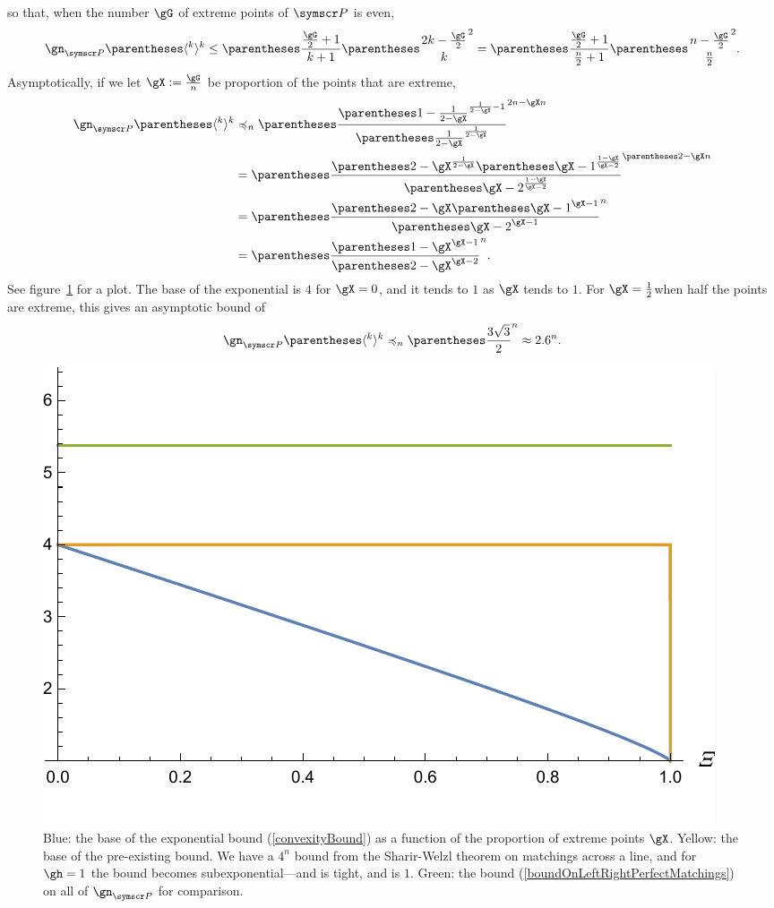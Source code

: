 so that, when the number $\gG$ of extreme points of $\pointset P$ is even,\[
\gn_{\pointset P}\of{\langle^k\rangle^k}\leq
\pa{\frac{\frac \gG 2+1}{k+1}\binom{2k-\frac \gG 2}{k}}^2=
\pa{\frac{\frac \gG 2+1}{\frac n 2+1}\binom{n-\frac \gG 2}{\frac n 2}}^2\text.
\]
Asymptotically, if we let $\gX\DefineAs\frac{\gG}{n}$ be proportion of the points that are extreme,
\begin{align}
\gn_{\pointset P}\of{\langle^k\rangle^k}
&\preccurlyeq_n
\pa{
  \frac
    {\pa{1-\frac{1}{2-\gX}}^{\frac{1}{2-\gX}-1}}
    {\pa{\frac{1}{2-\gX}}^{\frac{1}{2-\gX}}}
}^{2n-\gX n}\nonumber\\
&=
\pa{
  \frac
    {\pa{2-\gX}^{\frac{1}{2-\gX}} \pa{\gX-1}^{\frac{1-\gX}{\gX-2}}}
    {\pa{\gX-2}^{\frac{1-\gX}{\gX-2}}}
}^{\pa{2-\gX}n}\nonumber\\
&=
\pa{
  \frac
    {\pa{2-\gX} \pa{\gX-1}^{\gX-1}}
    {\pa{\gX-2}^{\gX-1}}
}^{n} \nonumber\\
&=
\pa{
  \frac
    {\pa{1-\gX}^{\gX-1}}
    {\pa{2-\gX}^{\gX-2}}
}^{n}\label{convexityBound}
\text.
\end{align}
See figure~\ref{figConvexityBound} for a plot.
The base of the exponential is $4$ for $\gX=0$, and it tends to $1$ as $\gX$ tends to $1$.
For $\gX=\frac 1 2$\idest when half the points are extreme, this gives an asymptotic bound of
\[
\gn_{\pointset P}\of{\langle^k\rangle^k}
\preccurlyeq_n
\pa{\frac{3\sqrt{3}}{2}}^n\approx 2.6^n\text.\]
\begin{figure}[htb!]
\centering
\includegraphics[scale=0.75]{convexity-bound}
\caption{Blue: the base of the exponential bound (\ref{convexityBound}) as a function of the
proportion of extreme points $\gX$. Yellow: the base of the pre-existing bound. We have a $4^n$
bound from the Sharir-Welzl theorem on matchings across a line, and for $\gh=1$ the bound becomes
subexponential---and is tight, and is $1$. Green: the bound (\ref{boundOnLeftRightPerfectMatchings})
on all of $\gn_{\pointset P}$ for comparison.\label{figConvexityBound}}
\end{figure}
